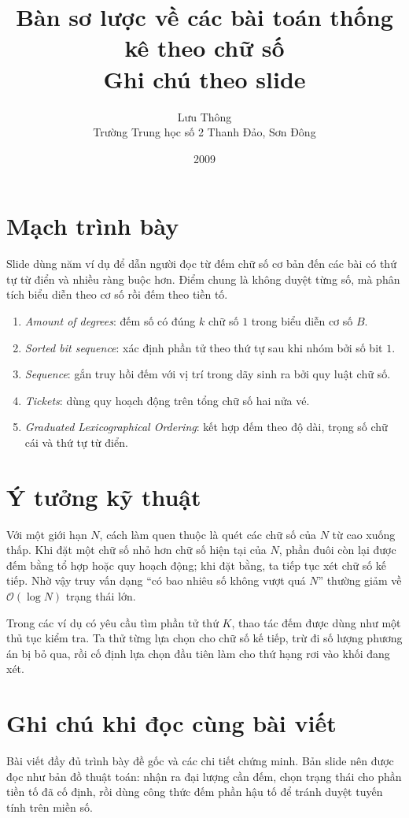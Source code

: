 \documentclass[11pt]{article}
\title{Bàn sơ lược về các bài toán thống kê theo chữ số\\{\large Ghi chú theo slide}}
\author{Lưu Thông\\Trường Trung học số 2 Thanh Đảo, Sơn Đông}
\date{2009}
\newcommand{\Oh}{\mathcal{O}}
\begin{document}
\maketitle


\section{Mạch trình bày}

Slide dùng năm ví dụ để dẫn người đọc từ đếm chữ số cơ bản đến các bài có
thứ tự từ điển và nhiều ràng buộc hơn. Điểm chung là không duyệt từng số, mà
phân tích biểu diễn theo cơ số rồi đếm theo tiền tố.

\begin{enumerate}
  \item \textit{Amount of degrees}: đếm số có đúng \(k\) chữ số \(1\) trong
  biểu diễn cơ số \(B\).
  \item \textit{Sorted bit sequence}: xác định phần tử theo thứ tự sau khi
  nhóm bởi số bit \(1\).
  \item \textit{Sequence}: gắn truy hồi đếm với vị trí trong dãy sinh ra bởi
  quy luật chữ số.
  \item \textit{Tickets}: dùng quy hoạch động trên tổng chữ số hai nửa vé.
  \item \textit{Graduated Lexicographical Ordering}: kết hợp đếm theo độ dài,
  trọng số chữ cái và thứ tự từ điển.
\end{enumerate}

\section{Ý tưởng kỹ thuật}

Với một giới hạn \(N\), cách làm quen thuộc là quét các chữ số của \(N\) từ
cao xuống thấp. Khi đặt một chữ số nhỏ hơn chữ số hiện tại của \(N\), phần
đuôi còn lại được đếm bằng tổ hợp hoặc quy hoạch động; khi đặt bằng, ta tiếp
tục xét chữ số kế tiếp. Nhờ vậy truy vấn dạng ``có bao nhiêu số không vượt quá
\(N\)'' thường giảm về \(\Oh(\log N)\) trạng thái lớn.

Trong các ví dụ có yêu cầu tìm phần tử thứ \(K\), thao tác đếm được dùng như
một thủ tục kiểm tra. Ta thử từng lựa chọn cho chữ số kế tiếp, trừ đi số lượng
phương án bị bỏ qua, rồi cố định lựa chọn đầu tiên làm cho thứ hạng rơi vào
khối đang xét.

\section{Ghi chú khi đọc cùng bài viết}

Bài viết đầy đủ trình bày đề gốc và các chi tiết chứng minh. Bản slide nên
được đọc như bản đồ thuật toán: nhận ra đại lượng cần đếm, chọn trạng thái cho
phần tiền tố đã cố định, rồi dùng công thức đếm phần hậu tố để tránh duyệt
tuyến tính trên miền số.
\end{document}

